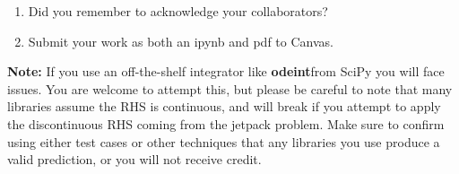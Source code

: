 \documentclass[12pt]{article}
\begin{document}
\begin{enumerate}
    \item Did you remember to acknowledge your collaborators?
    
    \item Submit your work as both an ipynb and pdf to Canvas.
\end{enumerate}

\noindent \textbf{Note:} If you use an off-the-shelf integrator like \textbf{odeint}from SciPy you will face issues. You are welcome to attempt this, but please be careful to note that many libraries assume the RHS is continuous, and will break if you attempt to apply the discontinuous RHS coming from the jetpack problem. Make sure to confirm using either test cases or other techniques that any libraries you use produce a valid prediction, or you will not receive credit.
\end{document}
